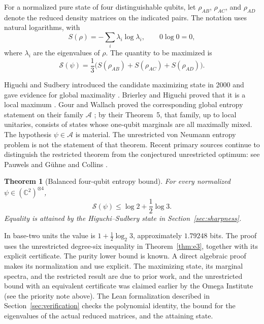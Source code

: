 \documentclass[11pt]{article}
\newtheorem{theorem}{Theorem}[section]
\theoremstyle{definition}
\theoremstyle{remark}
\newcommand{\C}{\mathbb C}
\begin{document}
For a normalized pure state of four distinguishable qubits, let
$\rho_{AB}$, $\rho_{AC}$, and $\rho_{AD}$ denote the reduced density
matrices on the indicated pairs. The notation uses natural logarithms, with
\[
 S(\rho)=-\sum_i\lambda_i\log\lambda_i,
 \qquad 0\log0=0,
\]
where $\lambda_i$ are the eigenvalues of $\rho$. The quantity to be
maximized is
\begin{equation}
 \mathcal S(\psi)=\frac13\bigl(S(\rho_{AB})+S(\rho_{AC})+S(\rho_{AD})\bigr).
 \label{eq:objective}
\end{equation}

Higuchi and Sudbery introduced the candidate maximizing state in 2000 and
gave evidence for global maximality \cite{HS00}. Brierley and Higuchi
proved that it is a local maximum \cite{BH07}. Gour and Wallach proved the
corresponding global entropy statement on their family $\mathcal A$
\cite[Theorem~10(a)]{GW10}; by their Theorem~5, that family, up to local
unitaries, consists of states whose one-qubit marginals are all maximally
mixed. The hypothesis $\psi\in\mathcal A$ is material. The unrestricted
von Neumann entropy problem is not the statement of that theorem.
Recent primary sources continue to distinguish the restricted theorem
from the conjectured unrestricted optimum: see Pauwels and G\"uhne
\cite[Section~IV.2 and Appendix~A]{PG26} and Collins
\cite[Section~3.2]{C26}.

\begin{theorem}[Balanced four-qubit entropy bound]
\label{thm:main}
For every normalized $\psi\in(\C^2)^{\otimes4}$,
\begin{equation}
 \mathcal S(\psi)\leq\log2+\frac12\log3.
 \label{eq:main}
\end{equation}
Equality is attained by the Higuchi--Sudbery state in
Section~\ref{sec:sharpness}.
\end{theorem}

In base-two units the value is $1+\tfrac12\log_2 3$, approximately
$1.79248$ bits. The proof uses the unrestricted degree-six inequality in Theorem~\ref{thm:e3}, together with
its explicit certificate. The purity lower bound is known. A direct algebraic proof makes its normalization and use explicit. The maximizing state, its marginal spectra, and the restricted result are due to prior work, and the unrestricted bound with an equivalent certificate was claimed earlier by the Omega Institute (see the priority note above). The Lean formalization described in Section~\ref{sec:verification} checks the polynomial identity, the bound for the eigenvalues of the actual reduced matrices, and the attaining state.
\end{document}
